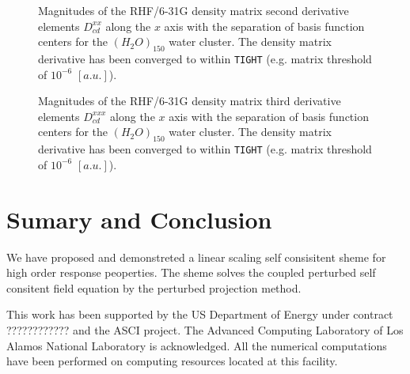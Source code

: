 \documentclass[prl,aps,twocolumn,showpacs,twocolumngrid,superbib]{revtex4}
\begin{document}
\begin{figure}[t]
  \caption{\protect
    Magnitudes of the RHF/6-31G density matrix second derivative elements $D^{xx}_{cd}$
    along the $x$ axis with the separation of basis function centers
    for the $(H_2O)_{150}$ water cluster. The density matrix 
    derivative has been converged to within {\tt TIGHT} (e.g. 
    matrix threshold of $10^{-6}$ $[a.u.]$).
  }\label{fig:Alpha_Decay}
\end{figure}


\begin{figure}[t]
  \caption{\protect
    Magnitudes of the RHF/6-31G density matrix third derivative elements $D^{xxx}_{cd}$
    along the $x$ axis with the separation of basis function centers
    for the $(H_2O)_{150}$ water cluster. The density matrix 
    derivative has been converged to within {\tt TIGHT} (e.g. 
    matrix threshold of $10^{-6}$ $[a.u.]$).
  }\label{fig:Alpha_Decay}
\end{figure}




\section{Sumary and Conclusion}


 We have proposed and demonstreted a linear scaling self
 consisitent sheme for high order response peoperties.
 The sheme solves the coupled perturbed self consitent field 
 equation by the perturbed projection method.



\begin{acknowledgments}
 This work has been supported by the US Department of Energy 
 under contract ???????????? and the ASCI project.  
 The Advanced Computing Laboratory of Los 
 Alamos National Laboratory is acknowledged.
 All the numerical computations have been
 performed on computing resources located at this facility.
\end{acknowledgments}

\end{document}
